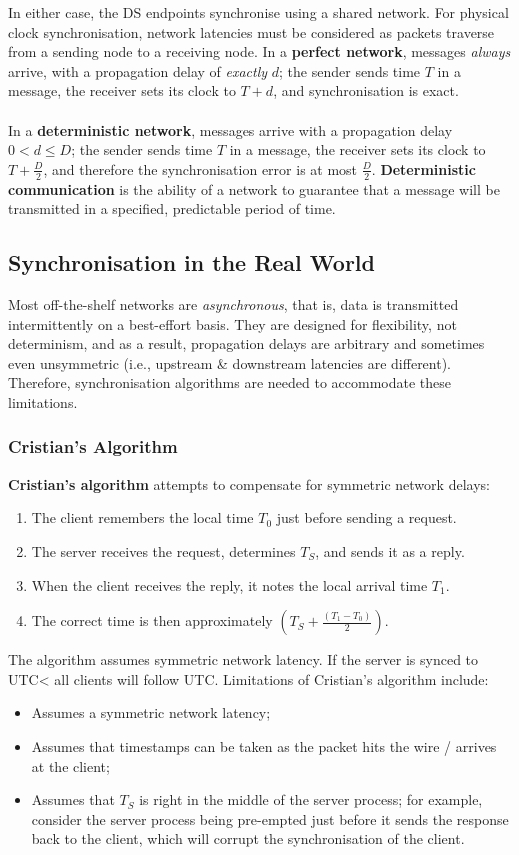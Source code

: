 \documentclass[a4paper,11pt]{article}
\begin{document}
In either case, the DS endpoints synchronise using a shared network.
For physical clock synchronisation, network latencies must be considered as packets traverse from a sending node to a receiving node.
In a \textbf{perfect network}, messages \textit{always} arrive, with a propagation delay of \textit{exactly} $d$;
the sender sends time $T$ in a message, the receiver sets its clock to $T + d$, and synchronisation is exact.
\\\\
In a \textbf{deterministic network}, messages arrive with a propagation delay $0 < d \leq D$;
the sender sends time $T$ in a message, the receiver sets its clock to $T + \frac{D}{2}$, and therefore the synchronisation error is at most $\frac{D}{2}$.
\textbf{Deterministic communication} is the ability of a network to guarantee that a message will be transmitted in a specified, predictable period of time.  

\subsection{Synchronisation in the Real World}
Most off-the-shelf networks are \textit{asynchronous}, that is, data is transmitted intermittently on a best-effort basis.
They are designed for flexibility, not determinism, and as a result, propagation delays are arbitrary and sometimes even unsymmetric (i.e., upstream \& downstream latencies are different).
Therefore, synchronisation algorithms are needed to accommodate these limitations.

\subsubsection{Cristian's Algorithm}
\textbf{Cristian's algorithm} attempts to compensate for symmetric network delays:
\begin{enumerate}
    \item   The client remembers the local time $T_0$ just before sending a request.
    \item   The server receives the request, determines $T_S$, and sends it as a reply.
    \item   When the client receives the reply, it notes the local arrival time $T_1$.
    \item   The correct time is then approximately $(T_S + \frac{(T_1 - T_0)}{2} )$.
\end{enumerate}

The algorithm assumes symmetric network latency.
If the server is synced to UTC< all clients will follow UTC.
Limitations of Cristian's algorithm include:
\begin{itemize}
    \item   Assumes a symmetric network latency;
    \item   Assumes that timestamps can be taken as the packet hits the wire / arrives at the client;
    \item   Assumes that $T_S$ is right in the middle of the server process; for example, consider the server process being pre-empted just before it sends the response back to the client, which will corrupt the synchronisation of the client.
\end{itemize}
\end{document}
